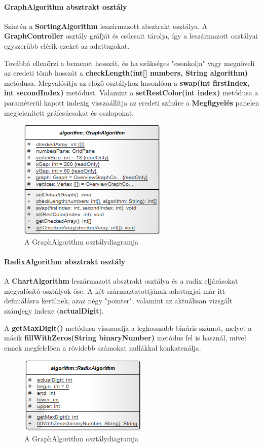 \documentclass{elteikthesis}
\begin{document}
\paragraph{GraphAlgorithm absztrakt osztály}
Szintén a \textbf{SortingAlgorithm} leszármazott absztrakt osztálya. A \textbf{GraphController} osztály gráfját és csúcsait tárolja, így a leszármazott osztályai egyszerűbb elérik ezeket az adattagokat.\par
Továbbá ellenőrzi a bemenet hosszát, és ha szükséges "csonkolja" vagy megnöveli az eredeti tömb hosszát a \textbf{checkLength(int[] numbers, String algorithm)} metódusa. Megvalósítja az előző osztályhoz hasonlóan a \textbf{swap(int firstIndex, int secondIndex)} metódust. Valamint a \textbf{setRestColor(int index)} metódusa a paraméterül kapott indexig visszaállítja az eredeti színűre a \textbf{Megfigyelés} panelen megjelenített gráfcsúcsokat és oszlopokat.
\begin{figure}[H]
	\centering
	\includegraphics{pics/class/GraphAlgorithm.png}
	\caption{A GraphAlgorithm osztálydiagramja}
\end{figure}
\paragraph{RadixAlgorithm absztrakt osztály}
A \textbf{ChartAlgorithm} leszármazott absztrakt osztálya és a radix eljárásokat megvalósító osztályok őse. A két származtatottjának adattagjai már itt definiálásra kerülnek, azaz négy "pointer", valamint az aktuálisan vizsgált számjegy indexe (\textbf{actualDigit}).\par
A \textbf{getMaxDigit()} metódusa visszaadja a leghosszabb bináris számot, melyet a másik \textbf{fillWithZeros(String binaryNumber)} metódus fel is használ, mivel ennek megfelelően a rövidebb számokat nullákkal konkatenálja.
\begin{figure}[H]
	\centering
	\includegraphics{pics/class/RadixAlgorithm.png}
	\caption{A GraphAlgorithm osztálydiagramja}
\end{figure}
\end{document}
